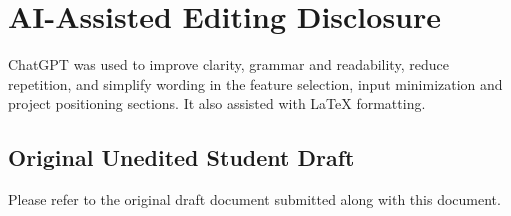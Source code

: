\documentclass[sigconf,nonacm]{acmart}
\begin{document}



\clearpage
\appendix
\section{AI-Assisted Editing Disclosure}

ChatGPT was used to improve clarity, grammar and readability,
reduce repetition, and simplify wording in the feature
selection, input minimization and project positioning
sections. It also assisted with LaTeX formatting.

\subsection{Original Unedited Student Draft}
Please refer to the original draft document submitted along with this document.
\end{document}
